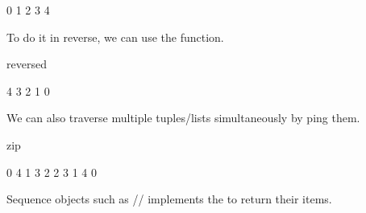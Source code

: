 \documentclass[letterpaper,10pt,english]{sphinxmanual}
\begin{document}
\begin{sphinxVerbatim}[commandchars=\\\{\}]
0 1 2 3 4 
\end{sphinxVerbatim}

To do it in reverse, we can use the  function.

\begin{sphinxVerbatim}[commandchars=\\\{\}]
reversed
  \PYG{p}{[}\PYG{p}{]}
     
\end{sphinxVerbatim}

\begin{sphinxVerbatim}[commandchars=\\\{\}]
4 3 2 1 0 
\end{sphinxVerbatim}

We can also traverse multiple tuples/lists simultaneously by ping them.

\begin{sphinxVerbatim}[commandchars=\\\{\}]
zip
  
  
    
\end{sphinxVerbatim}

\begin{sphinxVerbatim}[commandchars=\\\{\}]
0 4
1 3
2 2
3 1
4 0
\end{sphinxVerbatim}


Sequence objects such as // implements the  to return their items.
\end{document}
